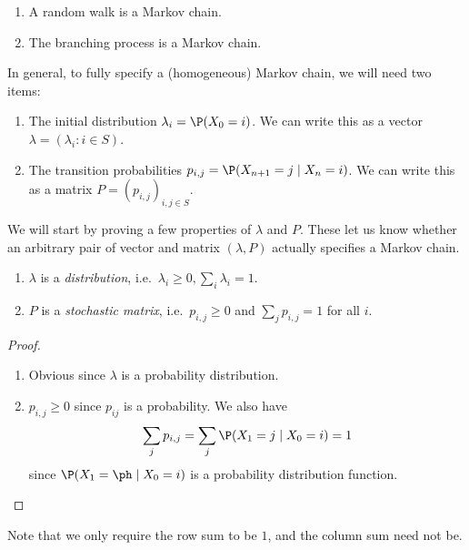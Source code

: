 \documentclass[a4paper]{article}
\begin{document}
\begin{eg}\leavevmode
  \begin{enumerate}
    \item A random walk is a Markov chain.
    \item The branching process is a Markov chain.
  \end{enumerate}
\end{eg}

In general, to fully specify a (homogeneous) Markov chain, we will need two items:
\begin{enumerate}
  \item The initial distribution $\lambda_i = \P(X_0 = i)$. We can write this as a vector $\lambda = (\lambda_i: i \in S)$.
  \item The transition probabilities $p_{i, j} = \P(X_{n + 1} = j \mid X_n = i)$. We can write this as a matrix $P = (p_{i, j})_{i, j\in S}$.
\end{enumerate}

We will start by proving a few properties of $\lambda$ and $P$. These let us know whether an arbitrary pair of vector and matrix $(\lambda, P)$ actually specifies a Markov chain.
\begin{prop}\leavevmode
  \begin{enumerate}
    \item $\lambda$ is a \emph{distribution}, i.e.\ $\lambda_i \geq 0, \sum_i \lambda_i = 1$.
    \item $P$ is a \emph{stochastic matrix}, i.e.\ $p_{i, j} \geq 0$ and $\sum_j p_{i, j} = 1$ for all $i$.
  \end{enumerate}
\end{prop}

\begin{proof}\leavevmode
  \begin{enumerate}
    \item Obvious since $\lambda$ is a probability distribution.
    \item $p_{i, j} \geq 0$ since $p_{ij}$ is a probability. We also have
      \[
        \sum_j p_{i,j} = \sum_j \P(X_{1} = j \mid X_0 = i) = 1
      \]
      since $\P(X_1 = \ph \mid X_0 = i)$ is a probability distribution function.\qedhere
  \end{enumerate}
\end{proof}
Note that we only require the row sum to be $1$, and the column sum need not be.
\end{document}
